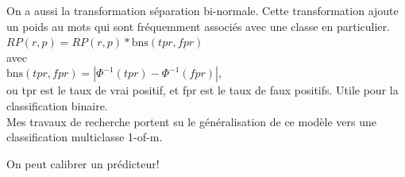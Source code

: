 \begin{frame}[t]
	
	On a aussi la transformation séparation bi-normale. Cette transformation ajoute un poids au mots qui sont fréquemment associés avec une classe en particulier. \\
	\bigskip
	$RP(r, p) = RP(r, p) * \textrm{bns}(tpr, fpr)$\\
	avec\\
	$\textrm{bns}(tpr, fpr) = |\Phi^{-1}(tpr) - \Phi^{-1}(fpr)| $,\\
	ou tpr est le taux de vrai positif, et fpr est le taux de faux positifs. Utile pour la classification binaire. \\
	\bigskip
	Mes travaux de recherche portent su le généralisation de ce modèle vers une classification multiclasse 1-of-m.
	
\end{frame}

\begin{frame}
	
	On peut calibrer un prédicteur!
	
\end{frame}




